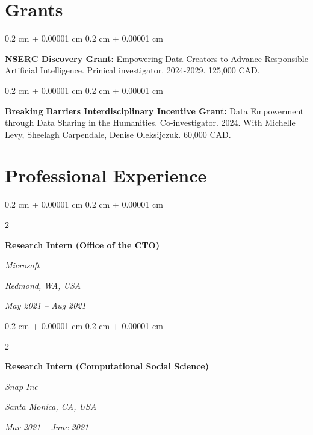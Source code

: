 \documentclass[10pt, letterpaper]{article}
\newenvironment{onecolentry}{
    \begin{adjustwidth}{
        0.2 cm + 0.00001 cm
    }{
        0.2 cm + 0.00001 cm
    }
}{
    \end{adjustwidth}
} %
\newenvironment{twocolentry}[2][]{
    \onecolentry
    \def\secondColumn{#2}
    \setcolumnwidth{\fill, 4.1 cm}
    \begin{paracol}{2}
}{
    \switchcolumn \raggedleft \secondColumn
    \end{paracol}
    \endonecolentry
} %
\begin{document}
    \section{Grants}



        
        \begin{onecolentry}
            \textbf{NSERC Discovery Grant:} Empowering Data Creators to Advance Responsible Artificial Intelligence. Prinical investigator. 2024-2029. 125,000 CAD.
        \end{onecolentry}

        \vspace{0.2 cm}

        \begin{onecolentry}
            \textbf{Breaking Barriers Interdisciplinary Incentive Grant:} Data Empowerment through Data Sharing in the Humanities. Co-investigator. 2024. With Michelle Levy, Sheelagh Carpendale, Denise Oleksijczuk. 60,000 CAD.
        \end{onecolentry}


    
    \section{Professional Experience}



        
        \begin{twocolentry}{
        \textit{Redmond, WA, USA}    
            
        \textit{May 2021 – Aug 2021}}
            \textbf{Research Intern (Office of the CTO)}
            
            \textit{Microsoft}
        \end{twocolentry}



        \vspace{0.2 cm}

        \begin{twocolentry}{
        \textit{Santa Monica, CA, USA}    
            
        \textit{Mar 2021 – June 2021}}
            \textbf{Research Intern (Computational Social Science)}
            
            \textit{Snap Inc}
        \end{twocolentry}



        \vspace{0.2 cm}
\end{document}
